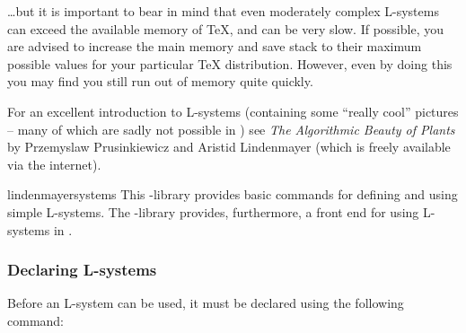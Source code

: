\noindent
\ldots but it is important to bear in mind that even moderately
complex L-systems can exceed the available memory of \TeX,
and can be very slow.
If possible, you are advised to increase the main memory and save
stack to their maximum possible values for your particular
\TeX{} distribution.
However, even by doing this you may find you still run out of memory
quite quickly.

For an excellent introduction to L-systems (containing some
``really cool'' pictures -- many of which are sadly not possible in
\pgfname)
see \emph{The Algorithmic Beauty of Plants} by
Przemyslaw Prusinkiewicz and Aristid Lindenmayer (which is freely
available via the internet).

\begin{pgflibrary}{lindenmayersystems}
  This \pgfname-library provides basic commands for defining and using
  simple L-systems. The \tikzname-library provides, furthermore, a
  front end for using L-systems in  \tikzname.
\end{pgflibrary}



\subsubsection{Declaring L-systems}
  Before an L-system can be used, it must be declared using the
  following command:

